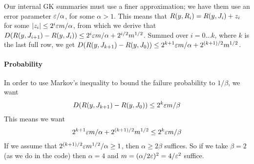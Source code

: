 \documentclass{article}
\theoremstyle{plain}
\newcommand{\D}[1]{D\p{#1}}
\newcommand{\rank}[2]{R\p{#1,#2}}
\begin{document}
Our internal GK summaries must use a finer approximation; we have them use an
error parameter $\varepsilon/\alpha$, for some $\alpha > 1$. This means that
$\rank{y}{R_i} = \rank{y}{J_i} + z_i$ for some $|z_i| \le 2^i \varepsilon m /
\alpha$, from which we derive that $\D{\rank{y}{J_{i+1}} - \rank{y}{J_i}} \le
2^i \ep m / \alpha + 2^{i/2} m^{1/2}$. Summed over $i = 0 \ldots k$, where $k$
is the last full row, we get $\D{\rank{y}{J_{k+1}} - \rank{y}{J_0}} \le 2^{k+1}
\ep m / \alpha + 2^{\p{k+1}/2} m^{1/2}$.

\paragraph{Probability}
In order to use Markov's inequality to bound the failure probability to
$1/\beta$, we want
\begin{align*}
  \D{\rank{y}{J_{k+1}} - \rank{y}{J_0}} \le 2^k \ep m / \beta
\end{align*}
This means we want
\begin{align*}
  2^{k+1} \varepsilon m / \alpha + 2^{(k+1)/2} m^{1/2} \le 2^k \varepsilon m / \beta
\end{align*}
If we assume that $2^{(k+1)/2} \varepsilon m^{1/2} / \alpha \ge 1$, then $\alpha \ge 2
\beta$ suffices. So if we take $\beta = 2$ (as we do in the code) then $\alpha =
4$ and $m = (\alpha / 2 \varepsilon)^2 = 4 / \varepsilon^2$ suffice.

\end{document}

